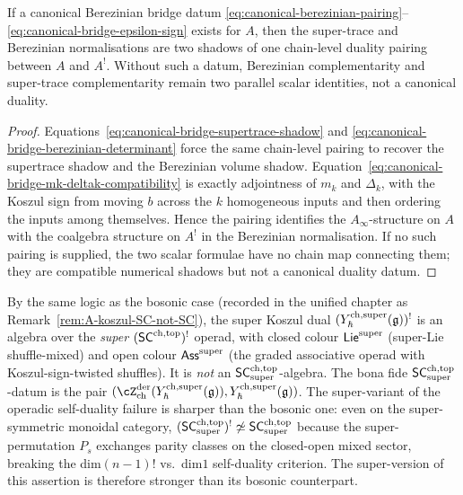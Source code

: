 \begin{proposition}
\ClaimStatusProvedHere
\label{prop:berezinian-bridge-criterion}
If a canonical Berezinian bridge datum
\eqref{eq:canonical-berezinian-pairing}--\eqref{eq:canonical-bridge-epsilon-sign}
exists for \(A\), then the super-trace and Berezinian normalisations are
two shadows of one chain-level duality pairing between \(A\) and \(A^!\).
Without such a datum, Berezinian complementarity and super-trace
complementarity remain two parallel scalar identities, not a canonical
duality.
\end{proposition}

\begin{proof}
Equations~\eqref{eq:canonical-bridge-supertrace-shadow} and
\eqref{eq:canonical-bridge-berezinian-determinant} force the same
chain-level pairing to recover the supertrace shadow and the Berezinian
volume shadow. Equation~\eqref{eq:canonical-bridge-mk-deltak-compatibility}
is exactly adjointness of \(m_k\) and \(\Delta_k\), with the Koszul sign
from moving \(b\) across the \(k\) homogeneous inputs and then ordering
the inputs among themselves. Hence the pairing identifies the
\(A_\infty\)-structure on \(A\) with the coalgebra structure on \(A^!\)
in the Berezinian normalisation. If no such pairing is supplied, the two
scalar formulae have no chain map connecting them; they are compatible
numerical shadows but not a canonical duality datum.
\end{proof}

\begin{remark}
\label{rem:super-koszul-SC-not-SC}
By the same logic as the bosonic case (recorded in the unified
chapter as Remark~\ref{rem:A-koszul-SC-not-SC}), the super Koszul dual
$(Y^{\mathrm{ch},\mathrm{super}}_{\hbar}(\mathfrak{g}))^{!}$ is an algebra over the \emph{super}
$(\mathsf{SC}^{\mathrm{ch},\mathrm{top}})^{!}$ operad, with closed colour $\mathsf{Lie}^{\mathrm{super}}$
(super-Lie shuffle-mixed) and open colour $\mathsf{Ass}^{\mathrm{super}}$ (the
graded associative operad with Koszul-sign-twisted shuffles). It is
\emph{not} an $\mathsf{SC}^{\mathrm{ch},\mathrm{top}}_{\mathrm{super}}$-algebra. The bona fide
$\mathsf{SC}^{\mathrm{ch},\mathrm{top}}_{\mathrm{super}}$-datum is the pair
$(\cZ^{\mathrm{der}}_{\mathrm{ch}}(\Ysuper_{\hbar}(\fg)),
\Ysuper_{\hbar}(\fg))$. The super-variant of the operadic
self-duality failure is sharper than the bosonic one: even on the
super-symmetric monoidal category, $(\mathsf{SC}^{\mathrm{ch},\mathrm{top}}_{\mathrm{super}})^{!}
\not\simeq \mathsf{SC}^{\mathrm{ch},\mathrm{top}}_{\mathrm{super}}$ because the super-permutation
$P_{s}$ exchanges parity classes on the closed-open mixed sector,
breaking the dim$(n-1)!$ vs.\ dim$1$ self-duality criterion. The
super-version of this assertion is therefore stronger than its bosonic
counterpart.
\end{remark}


